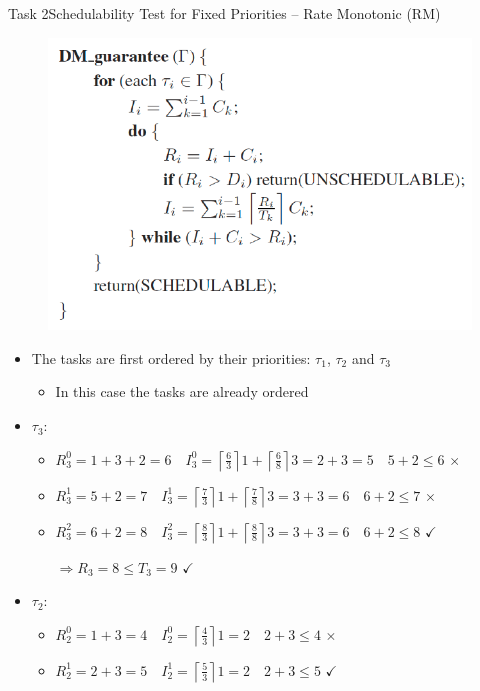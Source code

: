 \begin{frame}[allowframebreaks]{Task 2}{Schedulability Test for Fixed Priorities – Rate Monotonic (RM)}
\begin{requirementsnoinc}
\begin{figure}
      \includegraphics[height=0.5\paperheight]{./figures/2_algorithm.png}
    \end{figure}
  \end{requirementsnoinc}
  \begin{solutionnoinc}
    \begin{itemize}
      \item The tasks are first ordered by their priorities: $\tau_1$, $\tau_2$ and $\tau_3$
      \begin{itemize}
        \item In this case the tasks are already ordered
      \end{itemize}
      \item $\tau_3:$
      \begin{itemize}
        \item $R_3^0=1+3+2=6 \quad I_3^0=\left\lceil\frac{6}{3}\right\rceil 1+\left\lceil\frac{6}{8}\right\rceil 3=2+3=5 \quad 5+2 \le 6$ $\times$
        \item $R_3^1=5+2=7 \quad I_3^1=\left\lceil\frac{7}{3}\right\rceil 1+\left\lceil\frac{7}{8}\right\rceil 3=3+3=6 \quad 6+2 \le 7$ $\times$
        \item $R_3^2=6+2=8 \quad I_3^2=\left\lceil\frac{8}{3}\right\rceil 1+\left\lceil\frac{8}{8}\right\rceil 3=3+3=6 \quad 6+2 \le 8$ $\checkmark$

        $\Rightarrow R_3=8 \leq T_3=9$ $\checkmark$
      \end{itemize}
    \end{itemize}
  \end{solutionnoinc}
  \begin{solution}
    \begin{itemize}
      \item $\tau_2$:
        \begin{itemize}
          \item $R_2^0=1+3=4 \quad I_2^0=\left\lceil\frac{4}{3}\right\rceil 1=2 \quad 2+3 \le 4$ $\times$
          \item $R_2^1=2+3=5 \quad I_2^1=\left\lceil\frac{5}{3}\right\rceil 1=2 \quad 2+3 \leq 5$ $\checkmark$
        \end{itemize}


\end{itemize}
\end{solution}
\end{frame}
